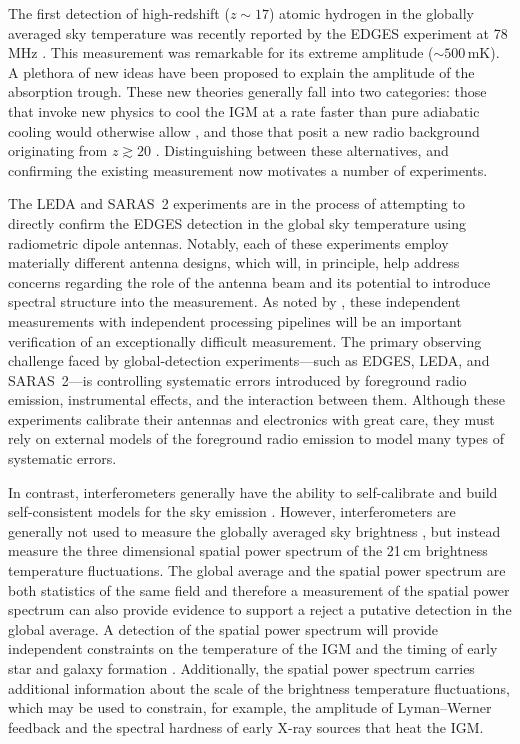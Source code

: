 \begin{bibunit}
The first detection of high-redshift ($z\sim 17$) atomic hydrogen in the globally averaged sky
temperature was recently reported by the EDGES experiment at 78\,MHz \citep{2018Natur.555...67B}.
This measurement was remarkable for its extreme amplitude ($\sim 500\,\text{mK}$).  A plethora of
new ideas have been proposed to explain the amplitude of the absorption trough. These new theories
generally fall into two categories: those that invoke new physics to cool the IGM at a rate faster
than pure adiabatic cooling would otherwise allow \citep[e.g.,][]{2018Natur.555...71B,
2018PhRvL.121a1101F}, and those that posit a new radio background originating from $z\gtrsim 20$
\citep[e.g.][]{2018arXiv180301815E, 2018ApJ...858L...9D}. Distinguishing between these alternatives,
and confirming the existing measurement now motivates a number of experiments.

The LEDA \citep{2018MNRAS.478.4193P} and SARAS~2 \citep{2018ApJ...858...54S} experiments are in the
process of attempting to directly confirm the EDGES detection in the global sky temperature using
radiometric dipole antennas.  Notably, each of these experiments employ materially different antenna
designs, which will, in principle, help address concerns regarding the role of the antenna beam and
its potential to introduce spectral structure into the measurement. As noted by
\citet{2018Natur.555...67B}, these independent measurements with independent processing pipelines
will be an important verification of an exceptionally difficult measurement.  The primary observing
challenge faced by global-detection experiments---such as EDGES, LEDA, and SARAS~2---is controlling
systematic errors introduced by foreground radio emission, instrumental effects, and the interaction
between them. Although these experiments calibrate their antennas and electronics with great care,
they must rely on external models of the foreground radio emission to model many types of systematic
errors.

In contrast, interferometers generally have the ability to self-calibrate and build self-consistent
models for the sky emission \citep[e.g.,][]{2018AJ....156...32E}. However, interferometers are
generally not used to measure the globally averaged sky brightness \citep{2016ApJ...826..116V}, but
instead measure the three dimensional spatial power spectrum of the 21\,cm brightness temperature
fluctuations. The global average and the spatial power spectrum are both statistics of the same
field and therefore a measurement of the spatial power spectrum can also provide evidence to support
a reject a putative detection in the global average.  A detection of the spatial power spectrum will
provide independent constraints on the temperature of the IGM and the timing of early star and
galaxy formation \citep[e.g.,][]{2017MNRAS.472.2651G}.  Additionally, the spatial power spectrum
carries additional information about the scale of the brightness temperature fluctuations, which may
be used to constrain, for example, the amplitude of Lyman--Werner feedback
\citep{2013MNRAS.432.2909F} and the spectral hardness of early X-ray sources
\citep{2014MNRAS.437L..36F} that heat the IGM.


\end{bibunit}
